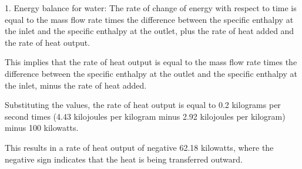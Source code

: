 1. Energy balance for water:
The rate of change of energy with respect to time is equal to the mass flow rate times the difference between the specific enthalpy at the inlet and the specific enthalpy at the outlet, plus the rate of heat added and the rate of heat output.

This implies that the rate of heat output is equal to the mass flow rate times the difference between the specific enthalpy at the outlet and the specific enthalpy at the inlet, minus the rate of heat added.

Substituting the values, the rate of heat output is equal to 0.2 kilograms per second times (4.43 kilojoules per kilogram minus 2.92 kilojoules per kilogram) minus 100 kilowatts.

This results in a rate of heat output of negative 62.18 kilowatts, where the negative sign indicates that the heat is being transferred outward.
